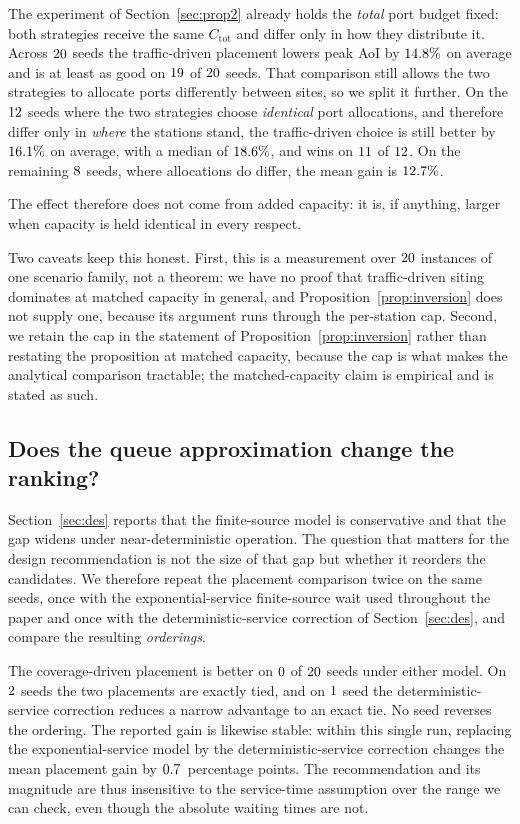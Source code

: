 The experiment of Section~\ref{sec:prop2} already holds the \emph{total} port budget
fixed: both strategies receive the same $C_{\mathrm{tot}}$ and differ only in how they
distribute it. Across $20$ seeds the traffic-driven placement lowers peak AoI by
$14.8\%$ on average and is at least as good on $19$ of $20$ seeds.
That comparison still allows the two strategies to allocate ports differently between
sites, so we split it further. On the $12$ seeds where the two strategies choose \emph{identical} port allocations, and therefore differ only in \emph{where}
the stations stand, the traffic-driven choice is still better by $16.1\%$ on
average, with a median of $18.6\%$, and wins on $11$ of
$12$. On the remaining $8$ seeds, where allocations do differ, the
mean gain is $12.7\%$.

The effect therefore does not come from added capacity: it is, if anything, larger when
capacity is held identical in every respect.

Two caveats keep this honest. First, this is a measurement over $20$ instances of
one scenario family, not a theorem: we have no proof that traffic-driven siting
dominates at matched capacity in general, and Proposition~\ref{prop:inversion} does not
supply one, because its argument runs through the per-station cap. Second, we retain the
cap in the statement of Proposition~\ref{prop:inversion} rather than restating the
proposition at matched capacity, because the cap is what makes the analytical comparison
tractable; the matched-capacity claim is empirical and is stated as such.

\subsection{Does the queue approximation change the ranking?}
\label{sec:ranking-md}

Section~\ref{sec:des} reports that the finite-source model is conservative and that the
gap widens under near-deterministic operation. The question that matters for the design
recommendation is not the size of that gap but whether it reorders the candidates. We
therefore repeat the placement comparison twice on the same seeds, once with the
exponential-service finite-source wait used throughout the paper and once with the
deterministic-service correction of Section~\ref{sec:des}, and compare the resulting
\emph{orderings}.

The coverage-driven placement is better on $0$ of $20$ seeds under
either model. On $2$ seeds the two placements are exactly tied, and on
$1$ seed the deterministic-service correction reduces a narrow advantage to an
exact tie. No seed reverses the ordering. The reported gain is likewise stable: within
this single run, replacing the exponential-service model by the deterministic-service
correction changes the mean placement gain by $0.7$~percentage points. The recommendation and its magnitude are thus insensitive to the service-time
assumption over the range we can check, even though the absolute waiting times are not.


